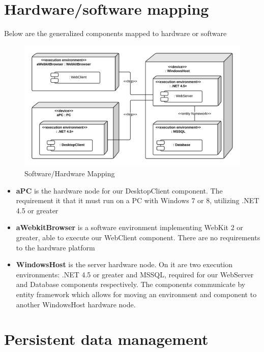 


\section{Hardware/software mapping}
\label{sec:Hardware/software mapping}
Below are the generalized components mapped to hardware or software
\begin{figure}[H]
\includegraphics[scale=0.2]{img/SoftwareHardwareMapping.png}
\caption{Software/Hardware Mapping}
\label{fig:SoftwareHardwareMapping}
\end{figure}

\begin{itemize}
\item \textbf{aPC} is the hardware node for our DesktopClient component. The requirement it that it must run on a PC with Windows 7 or 8, utilizing .NET 4.5 or greater
\item \textbf{aWebkitBrowser} is a software environment implementing WebKit 2 or greater, able to execute our WebClient component. There are no requirements to the hardware platform
\item \textbf{WindowsHost} is the server hardware node. On it are two execution environments: .NET 4.5 or greater and MSSQL, required for our WebServer and Database components respectively. The components communicate by entity framework which allows for moving an environment and component to another WindowsHost hardware node.
\end{itemize}

\section{Persistent data management}

